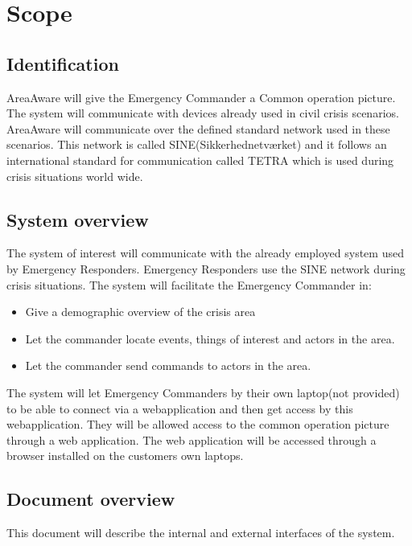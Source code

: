 \label{chp_scope}
\chapter{Scope}

\section{Identification}

AreaAware will give the Emergency Commander a Common operation picture. The system will communicate with devices already used in civil crisis scenarios. AreaAware will communicate over the defined standard network used in these scenarios. This
network is called SINE(Sikkerhednetværket) and it follows an international standard for communication called TETRA which is used during crisis situations world wide.

\section{System overview}
The system of interest will communicate with the already employed system used by Emergency Responders. Emergency Responders use the SINE network during crisis situations. The system will facilitate the Emergency Commander in:

\begin{itemize}
	\item  Give a demographic overview of the crisis area
	\item Let the commander locate events, things of interest and actors in the area.
	\item Let the commander send commands to actors in the area.
\end{itemize}

The system will let Emergency Commanders by their own laptop(not provided) to be able to connect via a webapplication and then get access by this webapplication. They will be allowed access to the common operation picture through a web application. The web application will be accessed through a browser installed on the customers own laptops.


\section{Document overview}
This document will describe the internal and external interfaces of the system.
